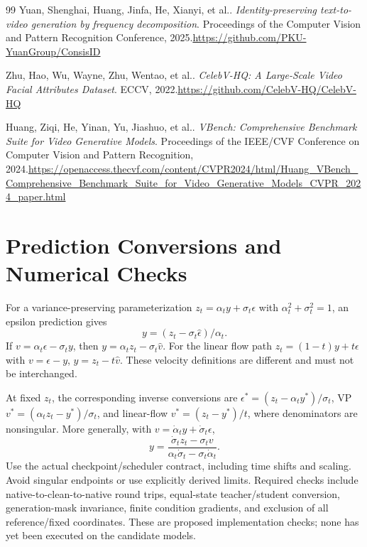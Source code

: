 \documentclass[11pt]{article}
\begin{document}
\begin{thebibliography}{99}
Yuan, Shenghai, Huang, Jinfa, He, Xianyi, et al.. \emph{Identity-preserving text-to-video generation by frequency decomposition}. Proceedings of the Computer Vision and Pattern Recognition Conference, 2025.\newline\url{https://github.com/PKU-YuanGroup/ConsisID}

Zhu, Hao, Wu, Wayne, Zhu, Wentao, et al.. \emph{CelebV-HQ: A Large-Scale Video Facial Attributes Dataset}. ECCV, 2022.\newline\url{https://github.com/CelebV-HQ/CelebV-HQ}

Huang, Ziqi, He, Yinan, Yu, Jiashuo, et al.. \emph{VBench: Comprehensive Benchmark Suite for Video Generative Models}. Proceedings of the IEEE/CVF Conference on Computer Vision and Pattern Recognition, 2024.\newline\url{https://openaccess.thecvf.com/content/CVPR2024/html/Huang_VBench_Comprehensive_Benchmark_Suite_for_Video_Generative_Models_CVPR_2024_paper.html}
\end{thebibliography}

\appendix
\section{Prediction Conversions and Numerical Checks}
For a variance-preserving parameterization $z_t=\alpha_t y+\sigma_t\epsilon$ with $\alpha_t^2+\sigma_t^2=1$, an epsilon prediction gives
\begin{equation}
 y=(z_t-\sigma_t\hat\epsilon)/\alpha_t.
\end{equation}
If $v=\alpha_t\epsilon-\sigma_t y$, then $y=\alpha_t z_t-\sigma_t\hat v$. For the linear flow path $z_t=(1-t)y+t\epsilon$ with $v=\epsilon-y$, $y=z_t-t\hat v$. These velocity definitions are different and must not be interchanged.

At fixed $z_t$, the corresponding inverse conversions are $\epsilon^*=(z_t-\alpha_t y^*)/\sigma_t$, VP $v^*=(\alpha_t z_t-y^*)/\sigma_t$, and linear-flow $v^*=(z_t-y^*)/t$, where denominators are nonsingular. More generally, with $v=\dot\alpha_t y+\dot\sigma_t\epsilon$,
\begin{equation}
 y=\frac{\dot\sigma_t z_t-\sigma_t v}
 {\alpha_t\dot\sigma_t-\sigma_t\dot\alpha_t}.
\end{equation}
Use the actual checkpoint/scheduler contract, including time shifts and scaling. Avoid singular endpoints or use explicitly derived limits. Required checks include native-to-clean-to-native round trips, equal-state teacher/student conversion, generation-mask invariance, finite condition gradients, and exclusion of all reference/fixed coordinates. These are proposed implementation checks; none has yet been executed on the candidate models.
\end{document}
